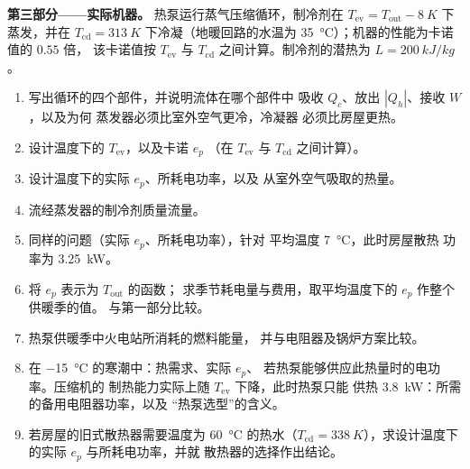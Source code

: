 \begin{problem}
\medskip
\noindent\textbf{第三部分——实际机器。}
热泵运行蒸气压缩循环，制冷剂在
$T_{\mathrm{ev}} = T_{\mathrm{out}} - \qty{8}{K}$ 下蒸发，并在
$T_{\mathrm{cd}} = \qty{313}{K}$ 下冷凝（地暖回路的水温为
\qty{35}{\degreeCelsius}）；机器的性能为卡诺值的 $0.55$ 倍，
该卡诺值按 $T_{\mathrm{ev}}$ 与 $T_{\mathrm{cd}}$ 之间计算。制冷剂的潜热为
$L = \qty{200}{kJ/kg}$。
\begin{enumerate}[resume]
  \item 写出循环的四个部件，并说明流体在哪个部件中
        吸收 $Q_c$、放出 $|Q_h|$、接收 $W$，以及为何
        蒸发器必须比室外空气更冷，冷凝器
        必须比房屋更热。
  \item 设计温度下的 $T_{\mathrm{ev}}$，以及卡诺 $e_p$
        （在 $T_{\mathrm{ev}}$ 与 $T_{\mathrm{cd}}$ 之间计算）。
  \item 设计温度下的实际 $e_p$、所耗电功率，以及
        从室外空气吸取的热量。
  \item 流经蒸发器的制冷剂质量流量。
  \item 同样的问题（实际 $e_p$、所耗电功率），针对
        平均温度 \qty{7}{\degreeCelsius}，此时房屋散热
        功率为 \qty{3.25}{kW}。
  \item 将 $e_p$ 表示为 $T_{\mathrm{out}}$ 的函数；
        求季节耗电量与费用，取平均温度下的 $e_p$ 作整个供暖季的值。
        与第一部分比较。
  \item 热泵供暖季中火电站所消耗的燃料能量，
        并与电阻器及锅炉方案比较。
  \item 在 \qty{-15}{\degreeCelsius} 的寒潮中：热需求、实际 $e_p$、
        若热泵能够供应此热量时的电功率。压缩机的
        制热能力实际上随 $T_{\mathrm{ev}}$ 下降，此时热泵只能
        供热 \qty{3.8}{kW}：所需的备用电阻器功率，以及
        “热泵选型”的含义。
  \item 若房屋的旧式散热器需要温度为
        \qty{60}{\degreeCelsius} 的热水（$T_{\mathrm{cd}} = \qty{338}{K}$），求设计温度下的实际 $e_p$
        与所耗电功率，并就
        散热器的选择作出结论。
\end{enumerate}


\end{problem}
